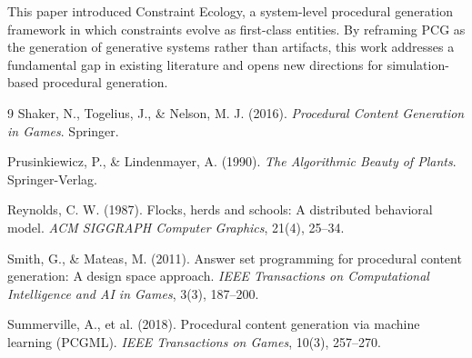 \documentclass[11pt]{article}
\begin{document}
This paper introduced Constraint Ecology, a system-level procedural generation framework in which constraints evolve as first-class entities. By reframing PCG as the generation of generative systems rather than artifacts, this work addresses a fundamental gap in existing literature and opens new directions for simulation-based procedural generation.

\begin{thebibliography}{9}
 Shaker, N., Togelius, J., \& Nelson, M. J. (2016). \textit{Procedural Content Generation in Games}. Springer.

 Prusinkiewicz, P., \& Lindenmayer, A. (1990). \textit{The Algorithmic Beauty of Plants}. Springer-Verlag.

 Reynolds, C. W. (1987). Flocks, herds and schools: A distributed behavioral model. \textit{ACM SIGGRAPH Computer Graphics}, 21(4), 25--34.

 Smith, G., \& Mateas, M. (2011). Answer set programming for procedural content generation: A design space approach. \textit{IEEE Transactions on Computational Intelligence and AI in Games}, 3(3), 187--200.

 Summerville, A., et al. (2018). Procedural content generation via machine learning (PCGML). \textit{IEEE Transactions on Games}, 10(3), 257--270.
\end{thebibliography}
\end{document}
